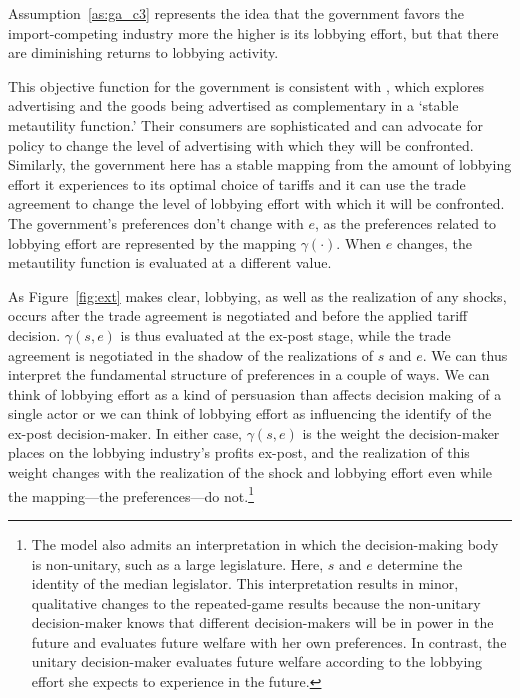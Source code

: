 \documentclass[12pt]{article}
\newcommand{\ga}{\gamma}
\begin{document}
Assumption~\ref{as:ga_c3} represents the idea that the government favors the import-competing industry more the higher is its lobbying effort, but that there are diminishing returns to lobbying activity. 

This objective function for the government is consistent with \Textcite{bm93}, which explores advertising and the goods being advertised as complementary in a `stable metautility function.' Their consumers are sophisticated and can advocate for policy to change the level of advertising with which they will be confronted. Similarly, the government here has a stable mapping from the amount of lobbying effort it experiences to its optimal choice of tariffs and it can use the trade agreement to change the level of lobbying effort with which it will be confronted. The government's preferences don't change with $e$, as the preferences related to lobbying effort are represented by the mapping $\ga(\cdot)$. When $e$ changes, the metautility function is evaluated at a different value.

As Figure~\ref{fig:ext} makes clear, lobbying, as well as the realization of any shocks, occurs after the trade agreement is negotiated and before the applied tariff decision. $\ga(s,e)$ is thus evaluated at the ex-post stage, while the trade agreement is negotiated in the shadow of the realizations of $s$ and $e$. We can thus interpret the fundamental structure of preferences in a couple of ways. We can think of lobbying effort as a kind of persuasion than affects decision making of a single actor or we can think of lobbying effort as influencing the identify of the ex-post decision-maker. In either case, $\ga(s,e)$ is the weight the decision-maker places on the lobbying industry's profits ex-post, and the realization of this weight changes with the realization of the shock and lobbying effort even while the mapping---the preferences---do not.\footnote{The model also admits an interpretation in which the decision-making body is non-unitary, such as a large legislature. Here, $s$ and $e$ determine the identity of the median legislator. This interpretation results in minor, qualitative changes to the repeated-game results because the non-unitary decision-maker knows that different decision-makers will be in power in the future and evaluates future welfare with her own preferences. In contrast, the unitary decision-maker evaluates future welfare according to the lobbying effort she expects to experience in the future.} 
\end{document}
